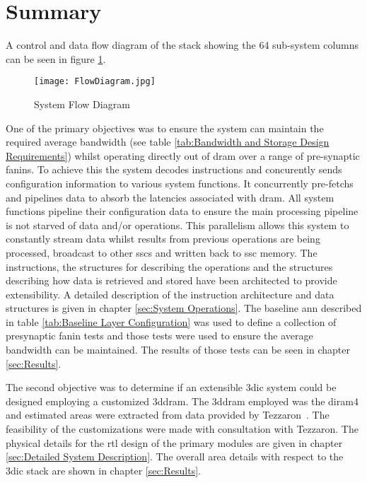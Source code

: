 \section{Summary}
\label{sec:Overview Summary}

A control and data flow diagram of the stack showing the 64 sub-system columns can be seen in figure \ref{fig:FlowDiagram}.
\begin{figure}[!t]
\centering
\captionsetup{justification=centering}
\centerline{
\mbox{\texttt{[image: FlowDiagram.jpg]}}
}
\caption{System Flow Diagram}
\label{fig:FlowDiagram}
\end{figure}


One of the primary objectives was to ensure the system can maintain the required average bandwidth (see table \ref{tab:Bandwidth and Storage Design Requirements}) whilst operating directly out of \ac{dram} over a range of pre-synaptic fanins.
To achieve this the system decodes instructions and concurently sends configuration information to various system functions.
It concurrently pre-fetchs and pipelines data to absorb the latencies associated with \ac{dram}.
All system functions pipeline their configuration data to ensure the main processing pipeline is not starved of data and/or operations.
This parallelism allows this system to constantly stream data whilst results from previous operations are being processed, broadcast to other \acp{ssc} and written back to \ac{ssc} memory.
The instructions, the structures for describing the operations and the structures describing how data is retrieved and stored have been architected to provide extensibility.
A detailed description of the instruction architecture and data structures is given in chapter \ref{sec:System Operations}.
The baseline \ac{ann} described in table \ref{tab:Baseline Layer Configuration} was used to define a collection of presynaptic fanin tests and those tests were used to ensure the average bandwidth can be maintained.
The results of those tests can be seen in chapter \ref{sec:Results}.


The second objective was to determine if an extensible \ac{3dic} system could be designed employing a customized \ac{3ddram}.
The \ac{3ddram} employed was the \ac{diram4} and estimated areas were extracted from data provided by Tezzaron\textregistered~\cite{patti2014}.
The feasibility of the customizations were made with consultation with Tezzaron\textregistered.
The physical details for the \ac{rtl} design of the primary modules are given in chapter \ref{sec:Detailed System Description}.
The overall area details with respect to the \ac{3dic} stack are shown in chapter \ref{sec:Results}.



